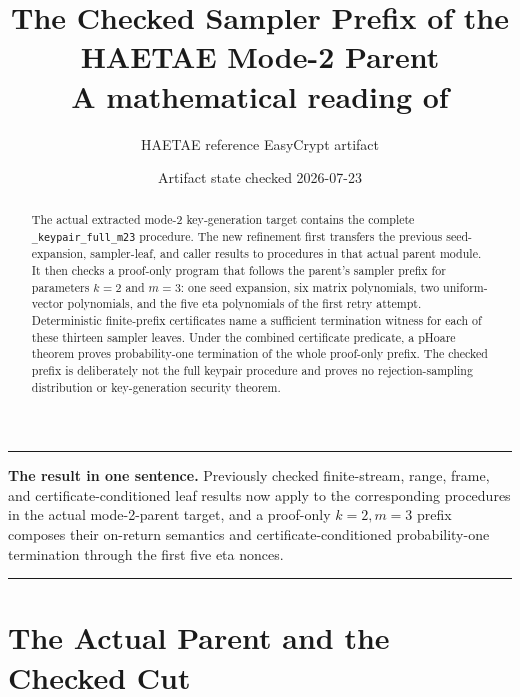\documentclass[11pt]{article}
\title{The Checked Sampler Prefix of the HAETAE Mode-2 Parent\\
\large A mathematical reading of \code{TargetKeygenMode2Parent*.ec}}
\author{HAETAE reference EasyCrypt artifact}
\date{Artifact state checked 2026-07-23}
\theoremstyle{definition}
\theoremstyle{plain}
\theoremstyle{remark}
\newcommand{\code}[1]{\nolinkurl{#1}}
\newenvironment{resultbox}
  {\begin{center}\begin{minipage}{0.94\linewidth}\color{artifactgreen}\hrule\vspace{0.6em}\color{black}}
  {\vspace{0.6em}\color{artifactgreen}\hrule\end{minipage}\end{center}}
\begin{document}
\maketitle

\begin{abstract}
The actual extracted mode-2 key-generation target contains the complete
\code{_keypair_full_m23} procedure.  The new refinement first transfers the
previous seed-expansion, sampler-leaf, and caller results to procedures in
that actual parent module.  It then checks a proof-only program that follows
the parent's sampler prefix for parameters \(k=2\) and \(m=3\): one seed
expansion, six matrix polynomials, two uniform-vector polynomials, and the
five eta polynomials of the first retry attempt.  Deterministic finite-prefix
certificates name a sufficient termination witness for each of these thirteen
sampler leaves.  Under the combined certificate predicate, a pHoare theorem
proves probability-one termination of the whole proof-only prefix.  The
checked prefix is deliberately not the full keypair procedure and proves no
rejection-sampling distribution or key-generation security theorem.
\end{abstract}

\begin{resultbox}
\textbf{The result in one sentence.}
Previously checked finite-stream, range, frame, and certificate-conditioned
leaf results now apply to the corresponding procedures in the actual
mode-2-parent target, and a proof-only \(k=2,m=3\) prefix composes their
on-return semantics and certificate-conditioned probability-one termination
through the first five eta nonces.
\end{resultbox}

\section{The Actual Parent and the Checked Cut}
\end{document}
